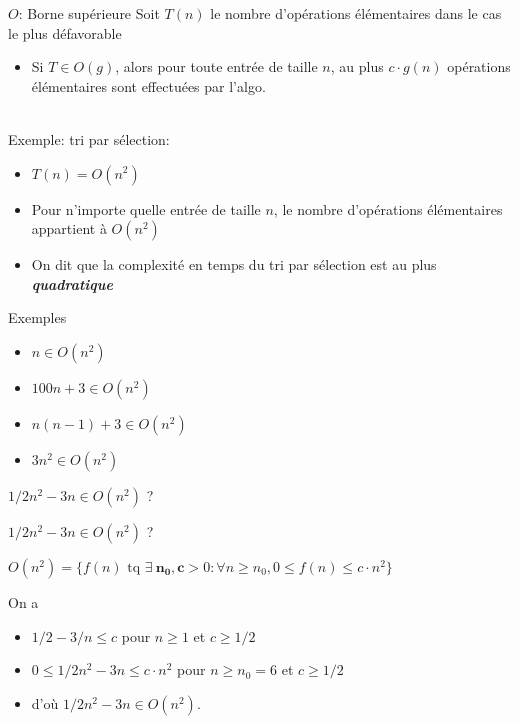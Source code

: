 \begin{frame}{$O$: Borne supérieure}
  Soit $T(n)$ le nombre d'opérations élémentaires dans le cas le plus défavorable
  \begin{itemize}
  \item Si $T \in O(g)$, alors  pour toute  entrée de taille $n$, au
    plus $c\cdot{} g(n)$ opérations élémentaires sont effectuées par l'algo.
  \end{itemize}
~\\
Exemple: tri par sélection:
\begin{itemize}
\item $T(n) = O(n^2)$
\item Pour n'importe quelle entrée de taille $n$, le nombre
  d'opérations élémentaires appartient à $O(n^2)$
\item On dit que la complexité en temps du tri par sélection est au
  plus \textbf{\emph{quadratique}}
\end{itemize}
\end{frame}

\begin{frame}{Exemples}
  \begin{itemize}
  \item $n \in O(n^2)$
  \item $100n+3 \in O(n^2)$
  \item $n(n-1) + 3 \in O(n^2)$
  \item $3n^2 \in O(n^2)$
  \end{itemize}
\end{frame}

\begin{frame}{$1/2n^2 -3n \in O(n^2)$ ?}
  
\end{frame}

\begin{frame}{$1/2n^2 -3n \in O(n^2)$ ?}


$O(n^2)= \{f(n) \mbox{ tq } \exists \ \mathbf{n_0}, \mathbf{c} > 0: 
 \forall n \geq n_0, 0\leq f(n) \leq c\cdot{}n^2 \}$

On a
\begin{itemize}
\item  $1/2 -3/n \leq c$ pour $n \geq 1$ et $c \geq 1/2$
\item $0 \leq 1/2 n^2 -3n \leq c\cdot{}n^2$ pour $n \geq n_0 = 6$ et $c \geq
  1/2$
\item d'où $1/2 n^2 -3n \in O(n^2)$. 
\end{itemize}
\end{frame}



